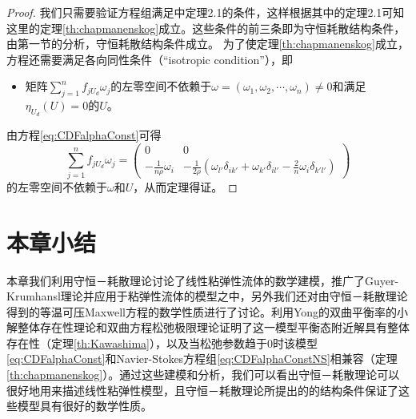 	\begin{proof}
		我们只需要验证方程组满足\cite{yang2015validity}中定理2.1的条件，这样根据其中的定理2.1可知这里的定理\ref{th:chapmanenskog}成立。这些条件的前三条即为守恒耗散结构条件，由第一节的分析，守恒耗散结构条件成立。%
		为了使定理\ref{th:chapmanenskog}成立，方程还需要满足各向同性条件（“isotropic condition”），即
		\begin{itemize}
			\item 矩阵$\sum_{j=1}^n f_{jU_d} \omega_j$的左零空间不依赖于$\omega = (\omega_1,\omega_2,\cdots,\omega_n) \neq 0$和满足$\eta_{U_d}(U)=0$的$U$。
		\end{itemize}
		由方程\eqref{eq:CDFalphaConst}可得
		\begin{equation*}
			\sum_{j=1}^n f_{jU_d} \omega_j = \left( \begin{matrix}
				0 & 0 \\
				-\frac{1}{n \rho} \omega_i & -\frac{1}{2 \rho} (\omega_{l'} \delta_{ik'} + \omega_{k'} \delta_{il'} - \frac{2}{n} \omega_i \delta_{k'l'})
			\end{matrix}
			\right)
		\end{equation*}
		的左零空间不依赖于$\omega$和$U$，从而定理得证。
	\end{proof}
	\section{本章小结}
	本章我们利用守恒－耗散理论讨论了线性粘弹性流体的数学建模，推广了Guyer-Krumhansl理论并应用于粘弹性流体的模型之中，另外我们还对由守恒－耗散理论得到的等温可压Maxwell方程的数学性质进行了讨论。利用Yong的双曲平衡率的小解整体存在性理论和双曲方程松弛极限理论证明了这一模型平衡态附近解具有整体存在性（定理\ref{th:Kawashima}），以及当松弛参数趋于$0$时该模型\eqref{eq:CDFalphaConst}和Navier-Stokes方程组\eqref{eq:CDFalphaConstNS}相兼容（定理\ref{th:chapmanenskog}）。通过这些建模和分析，我们可以看出守恒－耗散理论可以很好地用来描述线性粘弹性模型，且守恒－耗散理论所提出的的结构条件保证了这些模型具有很好的数学性质。


